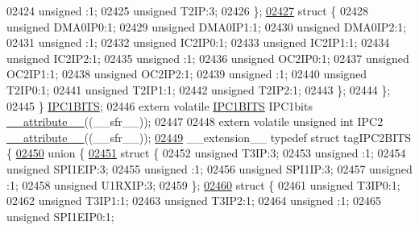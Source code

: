\begin{DoxyCode}
02424       \textcolor{keywordtype}{unsigned} :1;
02425       \textcolor{keywordtype}{unsigned} T2IP:3;
02426     \};
\hypertarget{a00015_source_l02427}{}\hyperlink{a00015}{02427}     \textcolor{keyword}{struct }\{
02428       \textcolor{keywordtype}{unsigned} DMA0IP0:1;
02429       \textcolor{keywordtype}{unsigned} DMA0IP1:1;
02430       \textcolor{keywordtype}{unsigned} DMA0IP2:1;
02431       \textcolor{keywordtype}{unsigned} :1;
02432       \textcolor{keywordtype}{unsigned} IC2IP0:1;
02433       \textcolor{keywordtype}{unsigned} IC2IP1:1;
02434       \textcolor{keywordtype}{unsigned} IC2IP2:1;
02435       \textcolor{keywordtype}{unsigned} :1;
02436       \textcolor{keywordtype}{unsigned} OC2IP0:1;
02437       \textcolor{keywordtype}{unsigned} OC2IP1:1;
02438       \textcolor{keywordtype}{unsigned} OC2IP2:1;
02439       \textcolor{keywordtype}{unsigned} :1;
02440       \textcolor{keywordtype}{unsigned} T2IP0:1;
02441       \textcolor{keywordtype}{unsigned} T2IP1:1;
02442       \textcolor{keywordtype}{unsigned} T2IP2:1;
02443     \};
02444   \};
02445 \} \hyperlink{a00014_d7/d84/a00535}{IPC1BITS};
02446 \textcolor{keyword}{extern} \textcolor{keyword}{volatile} \hyperlink{a00014_d7/d84/a00535}{IPC1BITS} IPC1bits \hyperlink{a00015_a493c46f03454991ccc5aa7a6e1dfb2a7}{\_\_attribute\_\_}((\_\_sfr\_\_));
02447 
02448 \textcolor{keyword}{extern} \textcolor{keyword}{volatile} \textcolor{keywordtype}{unsigned} \textcolor{keywordtype}{int}  IPC2 \hyperlink{a00015_a493c46f03454991ccc5aa7a6e1dfb2a7}{\_\_attribute\_\_}((\_\_sfr\_\_));
\hypertarget{a00015_source_l02449}{}\hyperlink{a00014}{02449} \_\_extension\_\_ \textcolor{keyword}{typedef} \textcolor{keyword}{struct }tagIPC2BITS \{
\hypertarget{a00015_source_l02450}{}\hyperlink{a00015}{02450}   \textcolor{keyword}{union }\{
\hypertarget{a00015_source_l02451}{}\hyperlink{a00015}{02451}     \textcolor{keyword}{struct }\{
02452       \textcolor{keywordtype}{unsigned} T3IP:3;
02453       \textcolor{keywordtype}{unsigned} :1;
02454       \textcolor{keywordtype}{unsigned} SPI1EIP:3;
02455       \textcolor{keywordtype}{unsigned} :1;
02456       \textcolor{keywordtype}{unsigned} SPI1IP:3;
02457       \textcolor{keywordtype}{unsigned} :1;
02458       \textcolor{keywordtype}{unsigned} U1RXIP:3;
02459     \};
\hypertarget{a00015_source_l02460}{}\hyperlink{a00015}{02460}     \textcolor{keyword}{struct }\{
02461       \textcolor{keywordtype}{unsigned} T3IP0:1;
02462       \textcolor{keywordtype}{unsigned} T3IP1:1;
02463       \textcolor{keywordtype}{unsigned} T3IP2:1;
02464       \textcolor{keywordtype}{unsigned} :1;
02465       \textcolor{keywordtype}{unsigned} SPI1EIP0:1;

\end{DoxyCode}
